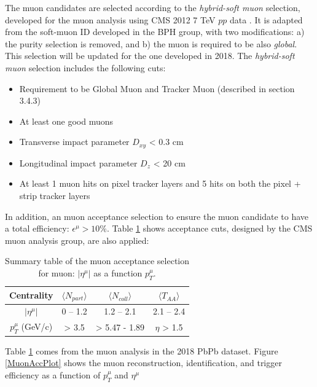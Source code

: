 The muon candidates are selected according to the \textit{hybrid-soft muon} selection, developed for the muon analysis using CMS 2012 7 TeV $pp$ data \cite{SoftMuon}. It is adapted from the soft-muon ID developed in the BPH group, with two modifications: a) the purity selection is removed, and b) the muon is required to be also \textit{global}. This selection will be updated for the one developed in 2018. The \textit{hybrid-soft muon} selection includes the following cuts:


\begin{itemize}
\item Requirement to be Global Muon and Tracker Muon (described in section 3.4.3)
\item At least one good muons 
\item Transverse impact parameter $D_{xy}$ < 0.3 cm
\item Longitudinal impact parameter $D_{z}$ < 20 cm
\item At least 1 muon hits on pixel tracker layers and 5 hits on both the pixel + strip tracker layers 
\end{itemize}

In addition, an muon acceptance selection to ensure the muon candidate to have a total efficiency: $\epsilon^\mu > 10\%$. Table \ref{MuonAccCut} shows acceptance cuts, designed by the CMS muon analysis group, are also applied:

\begin{table}[h]
\begin{center}
\caption{Summary table of the muon acceptance selection for muon: $|\eta^\mu|$ as a function $p_T^\mu$.}
\vspace{1em}
\label{MuonAccCut}
  \begin{tabular}{ |c | c| c| c|}
    \hline 
Centrality &  $\langle N_{part} \rangle$ &$\langle N_{coll} \rangle$  & $\langle T_{AA} \rangle$  \\
     \hline
         \hline
 $|\eta^\mu|$ & 0 -- 1.2   & 1.2 -- 2.1  &  2.1 -- 2.4   \\
$p_T^\mu$ (GeV/c) &  > 3.5 &  > 5.47 - 1.89 & $\eta$  > 1.5   \\
     \hline
    \hline
\end{tabular}
\end{center}
\end{table}

Table \ref{MuonAccCut} comes from the muon analysis in the 2018 PbPb dataset. Figure \ref{MuonAccPlot} shows the muon reconstruction, identification, and trigger efficiency as a function of $p_T^\mu$ and $\eta^{\mu}$ \cite{MuonAccRef}

